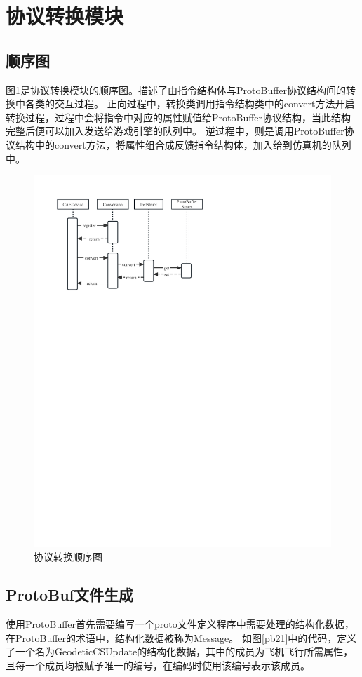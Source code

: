 \section{协议转换模块}
\subsection{顺序图}
图\ref{seq2}是协议转换模块的顺序图。描述了由指令结构体与ProtoBuffer协议结构间的转换中各类的交互过程。
正向过程中，转换类调用指令结构类中的convert方法开启转换过程，过程中会将指令中对应的属性赋值给ProtoBuffer协议结构，当此结构完整后便可以加入发送给游戏引擎的队列中。
逆过程中，则是调用ProtoBuffer协议结构中的convert方法，将属性组合成反馈指令结构体，加入给到仿真机的队列中。
\begin{figure}[h!]
    \begin{center}
        \includegraphics[width=\textwidth]{pictures/seq2.pdf}
        \caption{协议转换顺序图}
        \label{seq2}
    \end{center}
\end{figure}
\subsection{ProtoBuf文件生成}
使用ProtoBuffer首先需要编写一个proto文件定义程序中需要处理的结构化数据，在ProtoBuffer的术语中，结构化数据被称为Message。
如图\ref{pb21}中的代码，定义了一个名为GeodeticCSUpdate的结构化数据，其中的成员为飞机飞行所需属性，且每一个成员均被赋予唯一的编号，在编码时使用该编号表示该成员。


